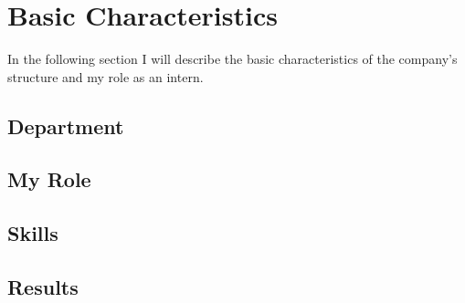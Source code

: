 
\chapter{Basic Characteristics} %
In the following section I will describe the basic characteristics of the company’s structure and my role as an intern.
\label{Chapter2} 

\section{ Department }

\section{ My Role }


\section{ Skills }


\section{ Results }



